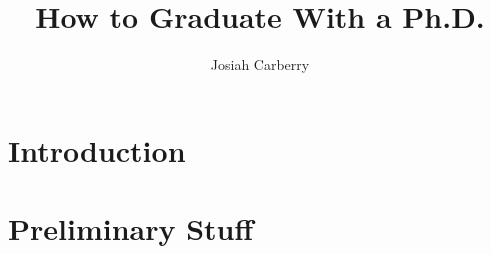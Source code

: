\documentclass[12pt]{report}   %
\title{
How to Graduate With a Ph.D.
}
\author{Josiah Carberry}
\begin{document}
\doublespacing
\begin{preliminaries}
\maketitle

\copyrightpage

\begin{signature}
  \setcounter{page}{3} %
\end{signature}

\begin{vita}
  
\end{vita}

\begin{acknowledgments}
  
\end{acknowledgments}

\begin{abstract}
  
  \thispagestyle{empty}
  \if@twoside
    \addtocounter{page}{-2}  
  \else
    \addtocounter{page}{-1}
  \fi
\end{abstract}

\begin{spacing}{1}
  \tableofcontents
  \clearpage{\pagestyle{empty}\cleardoublepage}

  \footnotesize
  \fontsize{11.5pt}{12.5pt}\selectfont
  \listoftables
  \clearpage{\pagestyle{empty}\cleardoublepage}

  \listoffigures
  \clearpage{\pagestyle{empty}\cleardoublepage}
  \normalsize
\end{spacing}

\end{preliminaries}

\pagestyle{myheadings}


\chapter{Introduction}

\clearpage{\pagestyle{empty}\cleardoublepage}

\chapter{Preliminary Stuff}

\clearpage{\pagestyle{empty}\cleardoublepage}
\end{document}
